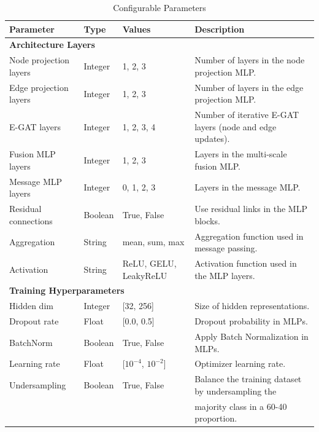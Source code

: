 \documentclass[journal]{IEEEtran}
\begin{document}
\begin{table}[htbp]
    \centering
    \caption{Configurable Parameters}
    \label{tab:hyperparameters}
    \begin{tabular}{llll}
        \toprule
        \textbf{Parameter} & \textbf{Type} & \textbf{Values} & \textbf{Description} \\
        \midrule
        \multicolumn{4}{l}{\textbf{Architecture Layers}} \\
        \midrule
        Node projection layers   & Integer   & 1, 2, 3         & Number of layers in the node projection MLP. \\
        Edge projection layers   & Integer   & 1, 2, 3         & Number of layers in the edge projection MLP. \\
        E-GAT layers              & Integer   & 1, 2, 3, 4      & Number of iterative E-GAT layers (node and edge updates). \\
        Fusion MLP layers        & Integer   & 1, 2, 3         & Layers in the multi-scale fusion MLP. \\
        Message MLP layers       & Integer   & 0, 1, 2, 3      & Layers in the message MLP. \\
        Residual connections     & Boolean   & True, False     & Use residual links in the MLP blocks. \\
        Aggregation              & String    & mean, sum, max  & Aggregation function used in message passing. \\
        Activation               & String    & ReLU, GELU, LeakyReLU & Activation function used in the MLP layers. \\
        \midrule
        \multicolumn{4}{l}{\textbf{Training Hyperparameters}} \\
        \midrule
        Hidden dim               & Integer   & [32, 256]       & Size of hidden representations. \\
        Dropout rate             & Float     & [0.0, 0.5]      & Dropout probability in MLPs. \\
        BatchNorm                & Boolean   & True, False     & Apply Batch Normalization in MLPs. \\
        Learning rate            & Float     & [$10^{-4}$, $10^{-2}$] & Optimizer learning rate. \\
        Undersampling            & Boolean   & True, False     & Balance the training dataset by undersampling the\\& & &  majority class in a 60-40 proportion. \\
        \bottomrule
    \end{tabular}
\end{table} 
\end{document}

